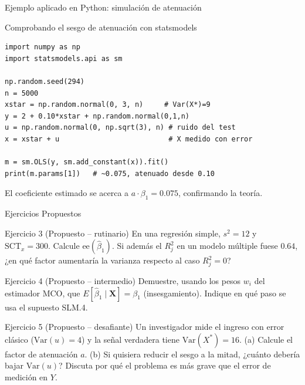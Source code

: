 \documentclass[10pt]{beamer}
\begin{document}
\begin{frame}[fragile]{Ejemplo aplicado en Python: simulación de atenuación}

\begin{exampleblock}{Comprobando el sesgo de atenuación con statsmodels}
\begin{verbatim}
import numpy as np
import statsmodels.api as sm

np.random.seed(294)
n = 5000
xstar = np.random.normal(0, 3, n)     # Var(X*)=9
y = 2 + 0.10*xstar + np.random.normal(0,1,n)
u = np.random.normal(0, np.sqrt(3), n) # ruido del test
x = xstar + u                          # X medido con error

m = sm.OLS(y, sm.add_constant(x)).fit()
print(m.params[1])   # ~0.075, atenuado desde 0.10
\end{verbatim}
\end{exampleblock}

El coeficiente estimado se acerca a $a\cdot\beta_1=0.075$, confirmando la teoría.

\end{frame}


\begin{frame}{Ejercicios Propuestos}

\begin{block}{Ejercicio 3 (Propuesto -- rutinario)}
En una regresión simple, $s^2=12$ y $\text{SCT}_x=300$. Calcule $\text{ee}(\hat\beta_1)$. Si además el $R^2_j$ en un modelo múltiple fuese $0.64$, ¿en qué factor aumentaría la varianza respecto al caso $R^2_j=0$?
\end{block}

\begin{block}{Ejercicio 4 (Propuesto -- intermedio)}
Demuestre, usando los pesos $w_i$ del estimador MCO, que $E[\hat\beta_1\mid\mathbf{X}]=\beta_1$ (insesgamiento). Indique en qué paso se usa el supuesto SLM.4.
\end{block}

\begin{block}{Ejercicio 5 (Propuesto -- desafiante)}
Un investigador mide el ingreso con error clásico ($\text{Var}(u)=4$) y la señal verdadera tiene $\text{Var}(X^*)=16$. (a) Calcule el factor de atenuación $a$. (b) Si quisiera reducir el sesgo a la mitad, ¿cuánto debería bajar $\text{Var}(u)$? Discuta por qué el problema es más grave que el error de medición en $Y$.
\end{block}

\end{frame}
\end{document}
